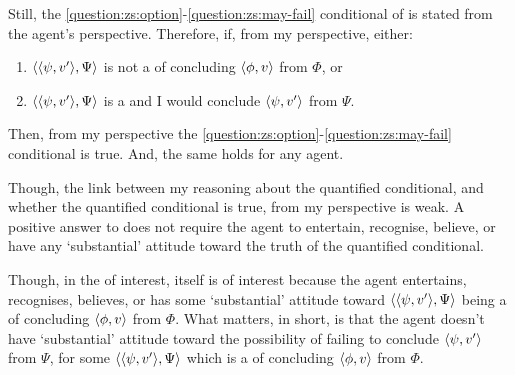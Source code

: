 \begin{note}[\qzS{} \(\forall\)]
  Still, the \ref{question:zs:option}-\ref{question:zs:may-fail} conditional of \qzS{} is stated from the agent's perspective.
  Therefore, if, from my perspective, either:
  \begin{enumerate}[label=\roman*., noitemsep]
  \item
    \(\langle \langle \psi, v' \rangle, \Psi \rangle\) is not a \requ{} of concluding \(\langle \phi, v \rangle\) from \(\Phi\), or
  \item
    \(\langle \langle \psi, v' \rangle, \Psi \rangle\) is a \requ{} and I would conclude \(\langle \psi, v' \rangle\) from \(\Psi\).
  \end{enumerate}
  Then, from my perspective the \ref{question:zs:option}-\ref{question:zs:may-fail} conditional is true.
  And, the same holds for any agent.

  Though, the link between my reasoning about the quantified conditional, and whether the quantified conditional is true, from my perspective is weak.
  A positive answer to \qzS{} does not require the agent to entertain, recognise, believe, or have any `substantial' attitude toward the truth of the quantified conditional.

  Though, in the  of interest, \qzS{} itself is of interest because the agent entertains, recognises, believes, or has some `substantial' attitude toward \(\langle \langle \psi, v' \rangle, \Psi \rangle\) being a \requ{} of concluding \(\langle \phi, v \rangle\) from \(\Phi\).
  What matters, in short, is that the agent doesn't have `substantial' attitude toward the possibility of failing to conclude \(\langle \psi, v' \rangle\) from \(\Psi\), for some \(\langle \langle \psi, v' \rangle, \Psi \rangle\) which is a \requ{} of concluding \(\langle \phi, v \rangle\) from \(\Phi\).
\end{note}

